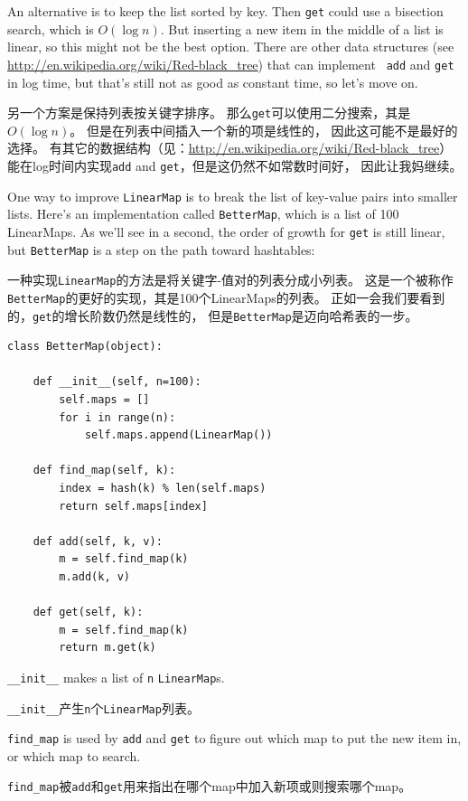 \documentclass[10pt]{book}
\begin{document}
\begin{CJK}{UTF8}{gbsn}
An alternative is to keep the list sorted by key.  Then {\tt get}
could use a bisection search, which is $O(\log n)$.  But inserting a
new item in the middle of a list is linear, so this might not be the
best option.  There are other data structures (see
  \url{http://en.wikipedia.org/wiki/Red-black_tree})  that can implement {\tt
  add} and {\tt get} in log time, but that's still not as good as
constant time, so let's move on.

另一个方案是保持列表按关键字排序。
那么{\tt get}可以使用二分搜索，其是$O(\log n)$。
但是在列表中间插入一个新的项是线性的，
因此这可能不是最好的选择。
有其它的数据结构（见：\url{http://en.wikipedia.org/wiki/Red-black_tree}）
能在log时间内实现{\tt add} and {\tt get}，但是这仍然不如常数时间好，
因此让我妈继续。

One way to improve {\tt LinearMap} is to break the list of key-value
pairs into smaller lists.  Here's an implementation called
{\tt BetterMap}, which is a list of 100 LinearMaps.  As we'll see
in a second, the order of growth for {\tt get} is still linear,
but {\tt BetterMap} is a step on the path toward hashtables:

一种实现{\tt LinearMap}的方法是将关键字-值对的列表分成小列表。
这是一个被称作{\tt BetterMap}的更好的实现，其是100个LinearMaps的列表。
正如一会我们要看到的，{\tt get}的增长阶数仍然是线性的，
但是{\tt BetterMap}是迈向哈希表的一步。

\begin{verbatim}
class BetterMap(object):

    def __init__(self, n=100):
        self.maps = []
        for i in range(n):
            self.maps.append(LinearMap())

    def find_map(self, k):
        index = hash(k) % len(self.maps)
        return self.maps[index]

    def add(self, k, v):
        m = self.find_map(k)
        m.add(k, v)

    def get(self, k):
        m = self.find_map(k)
        return m.get(k)
\end{verbatim}

\verb"__init__" makes a list of {\tt n} {\tt LinearMap}s.

\verb"__init__"产生{\tt n}个{\tt LinearMap}列表。

\verb"find_map" is used by
{\tt add} and {\tt get}
to figure out which map to put the
new item in, or which map to search.

\verb"find_map"被{\tt add}和{\tt get}用来指出在哪个map中加入新项或则搜索哪个map。


\end{CJK}
\end{document}
